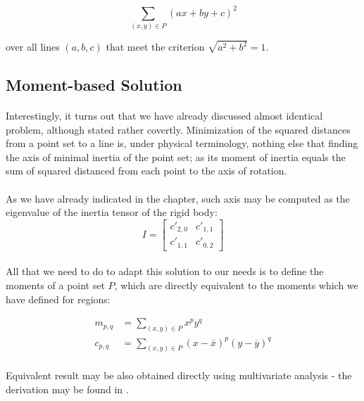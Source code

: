 \[
	\sum_{(x,y) \in P} (ax + by + c)^2
\]

over all lines $(a,b,c)$ that meet the criterion $\sqrt{a^2 + b^2} = 1$.

\subsection{Moment-based Solution}

\paragraph*{}
Interestingly, it turns out that we have already discussed almost identical problem, although stated rather covertly. Minimization of the squared distances from a point set to a line is, under physical terminology, nothing else that finding the axis of minimal inertia of the point set; as its moment of inertia equals the sum of squared distanced from each point to the axis of rotation.

\paragraph*{}
As we have already indicated in the  chapter, such axis may be computed as the eigenvalue of the inertia tensor of the rigid body:
\[
I = \begin{bmatrix}
c'_{2,0} & c'_{1,1}\\
c'_{1,1} & c'_{0,2}
\end{bmatrix}
\]

\paragraph*{}
All that we need to do to adapt this solution to our needs is to define the moments of a point set $P$, which are directly equivalent to the moments which we have defined for regions:

\begin{align*}
	m_{p,q} &= \sum_{(x,y) \in P} {x}^p {y}^q \\
	c_{p,q} &= \sum_{(x,y) \in P} ({x}-\overline{x})^p ({y}-\overline{y})^q
\end{align*}

\paragraph*{}
Equivalent result may be also obtained directly using multivariate analysis - the derivation may be found in \cite[p.~588-591]{Haralick92}.

